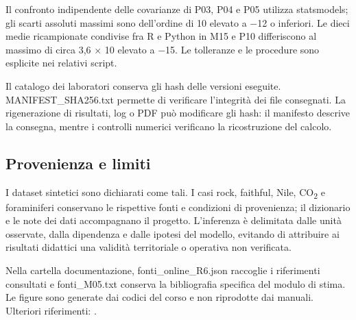 \documentclass[11pt,a4paper]{article}
\begin{document}
Il confronto indipendente delle covarianze di P03, P04 e P05 utilizza statsmodels; gli scarti assoluti massimi sono dell’ordine di 10 elevato a −12 o inferiori. Le dieci medie ricampionate condivise fra R e Python in M15 e P10 differiscono al massimo di circa 3,6 × 10 elevato a −15. Le tolleranze e le procedure sono esplicite nei relativi script.

Il catalogo dei laboratori conserva gli hash delle versioni eseguite. MANIFEST\_SHA256.txt permette di verificare l’integrità dei file consegnati. La rigenerazione di risultati, log o PDF può modificare gli hash: il manifesto descrive la consegna, mentre i controlli numerici verificano la ricostruzione del calcolo.

\subsection*{Provenienza e limiti}

I dataset sintetici sono dichiarati come tali. I casi rock, faithful, Nile, CO\textsubscript{2} e foraminiferi conservano le rispettive fonti e condizioni di provenienza; il dizionario e le note dei dati accompagnano il progetto. L’inferenza è delimitata dalle unità osservate, dalla dipendenza e dalle ipotesi del modello, evitando di attribuire ai risultati didattici una validità territoriale o operativa non verificata.

Nella cartella documentazione, fonti\_online\_R6.json raccoglie i riferimenti consultati e fonti\_M05.txt conserva la bibliografia specifica del modulo di stima. Le figure sono generate dai codici del corso e non riprodotte dai manuali. Ulteriori riferimenti: .
\end{document}
